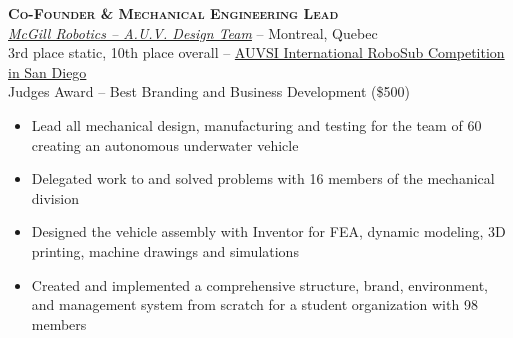 \documentclass[12pt, letterpaper]{article}
\newcommand{\years}[1]{\marginnote{\footnotesize #1}} %
\begin{document}
	\begin{samepage}
		\years{8/2013 - 8/2014} \textbf{\scshape Co-Founder \& Mechanical Engineering Lead}\\
		\href {http://www.mcgillrobotics.com}{\textit{McGill Robotics -- A.U.V. Design Team}} -- Montreal, Quebec\\
		{\small 3rd place static, 10th place overall -- \href {http://www.robosub.org}{AUVSI International RoboSub Competition in San Diego}}\\
		{\small Judges Award -- Best Branding and Business Development (\$500)}
		\begin{itemize}
			\item Lead all mechanical design, manufacturing and testing for the team of 60 creating an autonomous underwater vehicle 
			\item Delegated work to and solved problems with 16 members of the mechanical division
			\item Designed the vehicle assembly with Inventor for FEA, dynamic modeling, 3D printing, machine drawings and simulations
			\item Created and implemented a comprehensive structure, brand, environment, and management system from scratch for a student organization with 98 members
		\end{itemize}
	\end{samepage}

\clearpage
\end{document}
